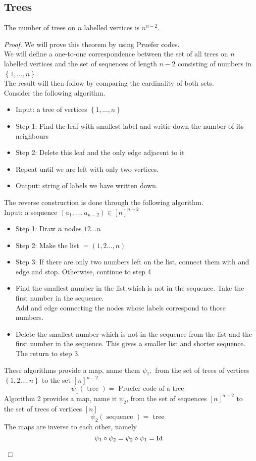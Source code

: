 \documentclass[../main.tex]{subfiles}
\begin{document}
\subsection{Trees}
\begin{thm}[Cayley]
	The number of trees on $n$ labelled vertices is $n^{n-2}$.
\end{thm}
\begin{proof}
We will prove this theorem by using Pruefer codes.\\
We will define a one-to-one correspondence between the set of all trees on $n$ labelled vertices and the set of sequences of length $n-2$ consisting of numbers in $ \left\{ 1, \ldots, n \right\} $.\\
The result will then follow by comparing the cardinality of both sets.\\
Consider the following algorithm.
\begin{itemize}
\item Input: a tree of vertices $ \left\{ 1, \ldots, n \right\} $ 
\item Step 1: Find the leaf with smallest label and writie down the number of its neighbours
\item Step 2: Delete this leaf and the only edge adjacent to it
\item Repeat until we are left with only two vertices.
\item Output: string of labels we have written down.
\end{itemize}
The reverse construction is done through the following algorithm.\\
Input: a sequence $ ( a_1, \ldots, a_{n-2} ) \in [ n] ^{n-2}$
\begin{itemize}
\item Step 1: Draw $n$ nodes $ 1 2 \ldots n$ 
\item  Step 2: Make the list $= ( 1, 2 \ldots, n) $ 
\item  Step 3: If there are only two numbers left on the list, connect them with and edge and stop. Otherwise, continue to step 4
\item Find the smallest number in the list which is not in the sequence. Take the first number in the sequence. \\
	Add and edge connecting the nodes whose labels correspond to those numbers.
\item Delete the smallest number which is not in the sequence from the list and the first number in the sequence. This gives a smaller list and shorter sequence. The return to step 3.
\end{itemize}
\begin{thm}
	These algorithms provide a map, name them $\psi_1,$ from the set of trees of vertices $ \left\{ 1,2 \ldots, n \right\} $ to the set $ [ n] ^{n-2}$ 
	\[ 
		\psi_1 ( \text{ tree } ) = \text{ Pruefer code of a tree }
	\]
	Algorithm 2 provides a map, name it $\psi_2$, from the set of sequences $ [ n] ^{n-2}$ to the set of trees of vertices $[n]$
	\[ 
		\psi_2 ( \text{ sequence } ) = \text{ tree } 
	\]
	The maps are inverse to each other, namely
	\[ 
		\psi_1 \circ \psi_2 = \psi_2 \circ \psi_1 = \operatorname*{Id}
	\]
	

\end{thm}
\end{proof}
\end{document}
